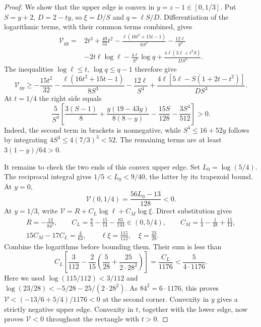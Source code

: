 \begin{proof}
We show that the upper edge is convex in $y=z-1\in[0,1/3]$.
Put $S=y+2$, $D=2-ty$, so $\xi=D/S$ and $q=\ell S/D$.
Differentiation of the logarithmic terms, with their common terms combined, gives
\begin{align*}
 \mathcal V_{yy}={}&2t^3+\frac{49}{32}t^2
 -\frac{\ell(16t^2+15t-1)}{8S^3}-\frac{12\ell}{S^4}\\
 &-2t\ell\log\ell-\frac{4\ell}{S^3}\log q
       +\frac{4\ell(3\ell+t^2S)}{DS^3}.
\end{align*}
The inequalities $\log\ell\le t$, $\log q\le q-1$ therefore give
\[
 \mathcal V_{yy}\ge-\frac{15t^2}{32}
 -\frac{\ell(16t^2+15t-1)}{8S^3}-\frac{12\ell}{S^4}
 +\frac{4\ell[5\ell-S(1+2t-t^2)]}{DS^3}.
\]
At $t=1/4$ the right side equals
\[
 \frac5{S^4}\left[
 \frac{3(S-1)}8+\frac{y(19-43y)}{8(8-y)}
             -\frac{15S}{128}-\frac{3S^4}{512}\right]>0.
\]
Indeed, the second term in brackets is nonnegative, while $S^4\le16+52y$ follows by
integrating $4S^3\le4(7/3)^3<52$. The remaining terms are at least $3(1-y)/64>0$.

It remains to check the two ends of this convex upper edge. Set $L_0=\log(5/4)$.
The reciprocal integral gives $1/5<L_0<9/40$, the latter by its trapezoid bound.
At $y=0$,
\[
 \mathcal V(0,1/4)=\frac{56L_0-13}{128}<0.
\]
At $y=1/3$, write $\mathcal V=R+C_L\log\ell+C_M\log\xi$. Direct substitution gives
\begin{gather*}
 R=-\frac{13}{84^2},\qquad
 C_L=\frac83-\frac{15}{14}-\frac{65}{144}\in(0,5/4),\qquad
 C_M=\frac14-\frac1{48}+\frac{15}{14},\\
 15C_M-17C_L=\frac4{63},\qquad \ell\xi=\frac{115}{112},\quad \xi=\frac{23}{28}.
\end{gather*}
Combine the logarithms before bounding them. Their sum is less than
\[
 C_L\left[\frac3{112}
       -\frac2{15}\left(\frac5{28}+\frac{25}{2\cdot28^2}\right)\right]
 =\frac{C_L}{1176}<\frac{5}{4\cdot1176}.
\]
Here we used $\log(115/112)<3/112$ and
$\log(23/28)<-5/28-25/(2\cdot28^2)$.
As $84^2=6\cdot1176$, this proves
$\mathcal V<( -13/6+5/4)/1176<0$ at the second corner.
Convexity in $y$ gives a strictly negative upper edge. Convexity in $t$, together with the
lower edge, now proves $\mathcal V<0$ throughout the rectangle with $t>0$.


\end{proof}
